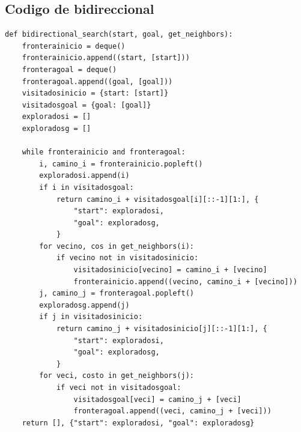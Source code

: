 \subsection{Codigo de bidireccional}

\begin{lstlisting}
def bidirectional_search(start, goal, get_neighbors):
    fronterainicio = deque()
    fronterainicio.append((start, [start]))
    fronteragoal = deque()
    fronteragoal.append((goal, [goal]))
    visitadosinicio = {start: [start]}
    visitadosgoal = {goal: [goal]}
    exploradosi = []
    exploradosg = []

    while fronterainicio and fronteragoal:
        i, camino_i = fronterainicio.popleft()
        exploradosi.append(i)
        if i in visitadosgoal:
            return camino_i + visitadosgoal[i][::-1][1:], {
                "start": exploradosi,
                "goal": exploradosg,
            }
        for vecino, cos in get_neighbors(i):
            if vecino not in visitadosinicio:
                visitadosinicio[vecino] = camino_i + [vecino]
                fronterainicio.append((vecino, camino_i + [vecino]))
        j, camino_j = fronteragoal.popleft()
        exploradosg.append(j)
        if j in visitadosinicio:
            return camino_j + visitadosinicio[j][::-1][1:], {
                "start": exploradosi,
                "goal": exploradosg,
            }
        for veci, costo in get_neighbors(j):
            if veci not in visitadosgoal:
                visitadosgoal[veci] = camino_j + [veci]
                fronteragoal.append((veci, camino_j + [veci]))
    return [], {"start": exploradosi, "goal": exploradosg}
\end{lstlisting}



